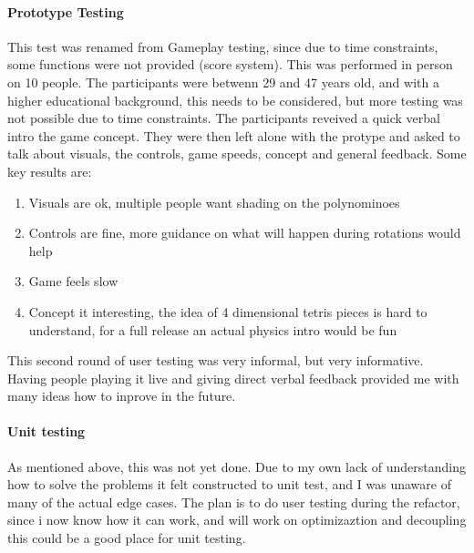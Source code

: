 \documentclass{article}
\begin{document}
\paragraph{Prototype Testing}
This test was renamed from Gameplay testing, since due to time constraints, some functions were not provided (score system).
This was performed in person on 10 people. The participants were betwenn 29 and 47 years old, and with a higher educational background, this needs to be considered, but more testing was not possible due to time constraints.\newline
The participants reveived a quick verbal intro the game concept. They were then left alone with the protype and asked to talk about visuals, the controls, game speeds, concept and general feedback.
Some key results are:
\begin{enumerate}
    \item Visuals are ok, multiple people want shading on the polynominoes
    \item Controls are fine, more guidance on what will happen during rotations would help
    \item Game feels slow
    \item Concept it interesting, the idea of 4 dimensional tetris pieces is hard to understand, for a full release an actual physics intro would be fun
\end{enumerate}
This second round of user testing was very informal, but very informative. Having people playing it live and giving direct verbal feedback provided me with many ideas how to inprove in the future.

\paragraph{Unit testing}
As mentioned above, this was not yet done. Due to my own lack of understanding how to solve the problems it felt constructed to unit test, and I was unaware of many of the actual edge cases. The plan is to do user testing during the refactor, since i now know how it can work, and will work on optimizaztion and decoupling this could be a good place for unit testing.


\end{document}
